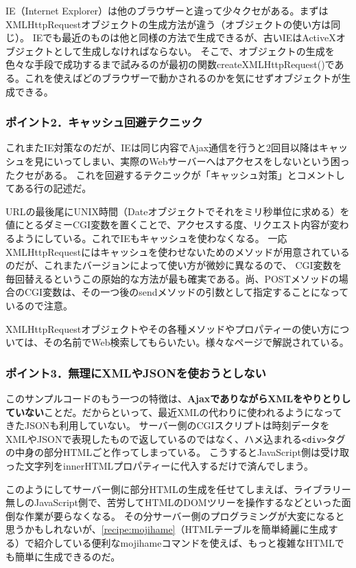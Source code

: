 IE（Internet Explorer）は他のブラウザーと違って少々クセがある。まずはXMLHttpRequestオブジェクトの生成方法が違う（オブジェクトの使い方は同じ）。
IEでも最近のものは他と同様の方法で生成できるが、古いIEはActiveXオブジェクトとして生成しなければならない。
そこで、オブジェクトの生成を色々な手段で成功するまで試みるのが最初の関数createXMLHttpRequest()である。これを使えばどのブラウザーで動かされるのかを気にせずオブジェクトが生成できる。

\subsubsection*{ポイント2．キャッシュ回避テクニック}

これまたIE対策なのだが、IEは同じ内容でAjax通信を行うと2回目以降はキャッシュを見にいってしまい、実際のWebサーバーへはアクセスをしないという困ったクセがある。
これを回避するテクニックが「キャッシュ対策」とコメントしてある行の記述だ。

URLの最後尾にUNIX時間（Dateオブジェクトでそれをミリ秒単位に求める）を値にとるダミーCGI変数を置くことで、アクセスする度、リクエスト内容が変わるようにしている。これでIEもキャッシュを使わなくなる。
一応XMLHttpRequestにはキャッシュを使わせないためのメソッドが用意されているのだが、これまたバージョンによって使い方が微妙に異なるので、
CGI変数を毎回替えるというこの原始的な方法が最も確実である。尚、POSTメソッドの場合のCGI変数は、その一つ後のsendメソッドの引数として指定することになっているので注意。

XMLHttpRequestオブジェクトやその各種メソッドやプロパティーの使い方については、その名前でWeb検索してもらいたい。様々なページで解説されている。

\subsubsection*{ポイント3．無理にXMLやJSONを使おうとしない}

このサンプルコードのもう一つの特徴は、\textbf{AjaxでありながらXMLをやりとりしていない}ことだ。だからといって、最近XMLの代わりに使われるようになってきたJSONも利用していない。
サーバー側のCGIスクリプトは時刻データをXMLやJSONで表現したもので返しているのではなく、ハメ込まれる\verb|<div>|タグの中身の部分HTMLごと作ってしまっている。
こうするとJavaScript側は受け取った文字列をinnerHTMLプロパティーに代入するだけで済んでしまう。

このようにしてサーバー側に部分HTMLの生成を任せてしまえば、ライブラリー無しのJavaScript側で、苦労してHTMLのDOMツリーを操作するなどといった面倒な作業が要らなくなる。
その分サーバー側のプログラミングが大変になると思うかもしれないが、\ref{recipe:mojihame}（HTMLテーブルを簡単綺麗に生成する）で紹介している便利なmojihameコマンドを使えば、もっと複雑なHTMLでも簡単に生成できるのだ。

